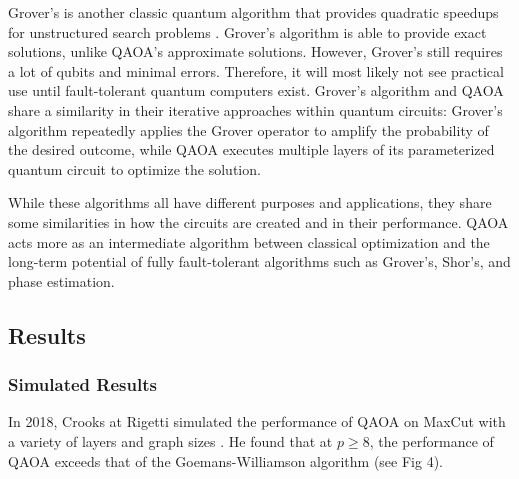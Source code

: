 Grover's is another classic quantum algorithm that provides quadratic speedups for unstructured search problems \cite{classBook}. Grover's algorithm is able to provide exact solutions, unlike QAOA's approximate solutions. However, Grover's still requires a lot of qubits and minimal errors. Therefore, it will most likely not see practical use until fault-tolerant quantum computers exist. Grover's algorithm and QAOA share a similarity in their iterative approaches within quantum circuits: Grover's algorithm repeatedly applies the Grover operator to amplify the probability of the desired outcome, while QAOA executes multiple layers of its parameterized quantum circuit to optimize the solution.

While these algorithms all have different purposes and applications, they share some similarities in how the circuits are created and in their performance. QAOA acts more as an intermediate algorithm between classical optimization and the long-term potential of fully fault-tolerant algorithms such as Grover's, Shor's, and phase estimation.

\subsection{Results}
\subsubsection{Simulated Results}
In 2018, Crooks at Rigetti simulated the performance of QAOA on MaxCut with a variety of layers and graph sizes \cite{24crooks2018performancequantumapproximateoptimization}. He found that at $p \geq 8$, the performance of QAOA exceeds that of the Goemans-Williamson algorithm \cite{24crooks2018performancequantumapproximateoptimization} (see Fig 4).

